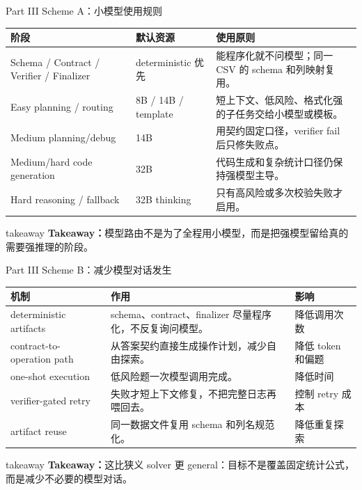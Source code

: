 \documentclass[aspectratio=169,UTF8]{ctexbeamer}
\newcommand{\takeaway}[1]{%
  \vspace{0.35em}
  \begin{beamercolorbox}[wd=\textwidth,sep=0.75ex,rounded=true]{takeaway}
    \textbf{Takeaway：}#1
  \end{beamercolorbox}
}
\begin{document}
\begin{frame}{Part III Scheme A：小模型使用规则}
\footnotesize
\begin{tabularx}{\textwidth}{p{} p{} X}
\toprule
阶段 & 默认资源 & 使用原则 \\
\midrule
Schema / Contract / Verifier / Finalizer & deterministic 优先 & 能程序化就不问模型；同一 CSV 的 schema 和列映射复用。 \\
Easy planning / routing & 8B / 14B / template & 短上下文、低风险、格式化强的子任务交给小模型或模板。 \\
Medium planning/debug & 14B & 用契约固定口径，verifier fail 后只修失败点。 \\
Medium/hard code generation & 32B & 代码生成和复杂统计口径仍保持强模型主导。 \\
Hard reasoning / fallback & 32B thinking & 只有高风险或多次校验失败才启用。 \\
\bottomrule
\end{tabularx}
\takeaway{模型路由不是为了全程用小模型，而是把强模型留给真的需要强推理的阶段。}
\end{frame}

\begin{frame}{Part III Scheme B：减少模型对话发生}
\footnotesize
\begin{tabularx}{\textwidth}{p{} X p{}}
\toprule
机制 & 作用 & 影响 \\
\midrule
deterministic artifacts & schema、contract、finalizer 尽量程序化，不反复询问模型。 & 降低调用次数 \\
contract-to-operation path & 从答案契约直接生成操作计划，减少自由探索。 & 降低 token 和偏题 \\
one-shot execution & 低风险题一次模型调用完成。 & 降低时间 \\
verifier-gated retry & 失败才短上下文修复，不把完整日志再喂回去。 & 控制 retry 成本 \\
artifact reuse & 同一数据文件复用 schema 和列名规范化。 & 降低重复探索 \\
\bottomrule
\end{tabularx}
\takeaway{这比狭义 solver 更 general：目标不是覆盖固定统计公式，而是减少不必要的模型对话。}
\end{frame}
\end{document}
